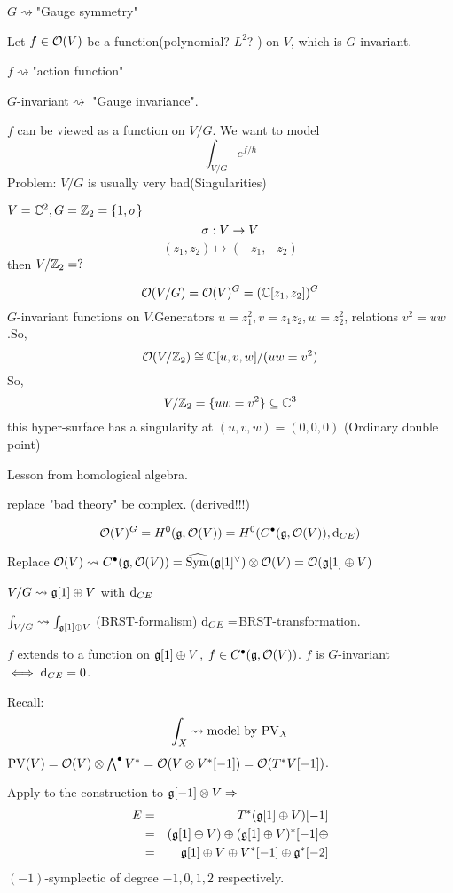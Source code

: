 $G\rightsquigarrow$"Gauge symmetry"

Let $f\in\mathcal{O}(V)$ be a function(polynomial? $L^2$? )
on $V$, which is $G$-invariant.

$f\rightsquigarrow$"action function"

$G$-invariant$\rightsquigarrow$ "Gauge invariance".

$f$ can be viewed as a function on $V/G$.
We want to model
$$\int_{V/G}e^{f/\hbar}$$
Problem: $V/G$ is usually very bad(Singularities)

\begin{example}
$V=\mathbb{C}^2,G=\mathbb{Z}_2=\{1,\sigma\}$
$$\sigma:V\to V$$
$$(z_1,z_2)\mapsto(-z_1,-z_2)$$
then $V/\mathbb{Z}_2=?$
\end{example}
$$\mathcal{O}(V/G)=\mathcal{O}(V)^G=(\mathbb{C}[z_1,z_2])^G$$
$G$-invariant functions on $V$.Generators $u=z_1^2,v=z_1z_2,w=z_2^2$,
relations $v^2=uw$.So,
$$\mathcal{O}(V/\mathbb{Z}_2)\cong \mathbb{C}[u,v,w]/(uw=v^2)$$
So,
$$V/\mathbb{Z}_2=\{uw=v^2\}\subseteq\mathbb{C}^3$$
this hyper-surface has a singularity at
$(u,v,w)=(0,0,0)$
(Ordinary double point)

Lesson from homological algebra.

replace "bad theory" be complex.
(derived!!!)

$$\mathcal{O}(V)^G=H^0(\mathfrak{g},\mathcal{O}(V))
=H^0(C^{\bullet}(\mathfrak{g},\mathcal{O}(V)),\mathrm{d}_{CE})$$

Replace $\mathcal{O}(V)\rightsquigarrow C^{\bullet}(\mathfrak{g},\mathcal{O}(V))=
\widehat{\operatorname{Sym}}(\mathfrak{g}[1]^\vee)\otimes\mathcal{O}(V)=\mathcal{O}(\mathfrak{g}[1]\oplus V)$

$V/G\rightsquigarrow\mathfrak{g}[1]\oplus V$ with $\mathrm{d}_{CE}$

$\int_{V/G}\rightsquigarrow\int_{\mathfrak{g}[1]\oplus V}$
(BRST-formalism) $\mathrm{d}_{CE}=$BRST-transformation.

$f$ extends to a function on $\mathfrak{g}[1]\oplus V$,
$f\in C^{\bullet}(\mathfrak{g},\mathcal{O}(V))$.
$f$ is $G$-invariant$\iff \mathrm{d}_{CE}=0$.
\vs

Recall:
$$\int_X\rightsquigarrow\text{model by $\operatorname{PV}_X$}$$
$\operatorname{PV}(V)=\mathcal{O}(V)\otimes\bigwedge\nolimits^{\bullet}V^*
=\mathcal{O}(V\otimes V^*[-1])=\mathcal{O}(T^*V[-1])$.

Apply to the construction to $\mathfrak{g}[-1]\otimes V\Rightarrow$
\begin{eqnarray*}
     E
&=&
     T^*(\mathfrak{g}[1]\oplus V)[-1]\\
&=&
     (\mathfrak{g}[1]\oplus V)\oplus
     (\mathfrak{g}[1]\oplus V)^*[-1]\oplus\\
&=&
     \mathfrak{g}[1]\oplus V\oplus V^*[-1]\oplus\mathfrak{g}^*[-2]
\end{eqnarray*}
$(-1)$-symplectic of degree $-1,0,1,2$ respectively.

